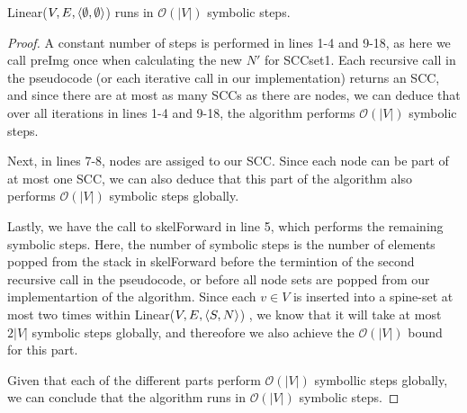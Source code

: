 \documentclass[../master/master.tex]{subfiles}
\begin{document}
\begin{theorem}\label{linear} Linear($V, E, \langle \emptyset, \emptyset\rangle$) runs in $\mathcal{O}(|V|)$ symbolic steps.
\end{theorem}
\begin{proof} A constant number of steps is performed in lines 1-4 and 9-18, as here we call preImg once when calculating the new $N'$ for SCCset1. Each recursive call in the pseudocode (or each iterative call in our implementation) returns an SCC, and since there are at most as many SCCs as there are nodes, we can deduce that over all iterations in lines 1-4 and 9-18, the algorithm performs $\mathcal{O}(|V|)$ symbolic steps.

Next, in lines 7-8, nodes are assiged to our SCC. Since each node can be part of at most one SCC, we can also deduce that this part of the algorithm also performs $\mathcal{O}(|V|)$ symbolic steps globally.

Lastly, we have the call to skelForward in line 5, which performs the remaining symbolic steps. Here, the number of symbolic steps is the number of elements popped from the stack in skelForward before the termintion of the second recursive call in the pseudocode, or before all node sets are popped from our implementartion of the algorithm. Since each $v\in V$ is inserted into a spine-set at most two times within Linear($V, E, \langle S, N\rangle$) \cite[p.~137-138]{linear}, we know that it will take at most $2|V|$ symbolic steps globally, and thereofore we also achieve the $\mathcal{O}(|V|)$ bound for this part.

Given that each of the different parts perform $\mathcal{O}(|V|)$ symbollic steps globally, we can conclude that the algorithm runs in $\mathcal{O}(|V|)$ symbolic steps.
\end{proof}
\end{document}
